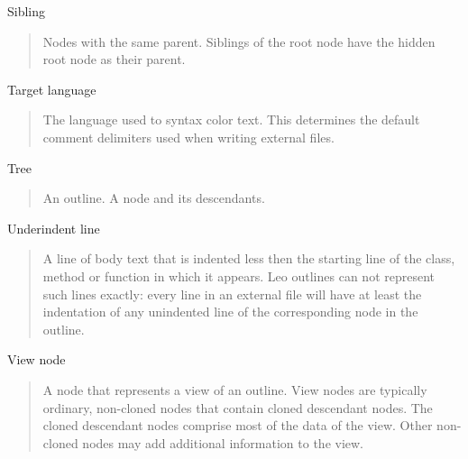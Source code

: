 \documentclass[a4paper,10pt,english]{sphinxmanual}
\begin{document}
Sibling
\begin{quote}

Nodes with the same parent. Siblings of the root node have the hidden root
node as their parent.
\end{quote}

Target language
\begin{quote}

The language used to syntax color text. This determines the default comment
delimiters used when writing external files.
\end{quote}

Tree
\begin{quote}

An outline. A node and its descendants.
\end{quote}

Underindent line
\begin{quote}

A line of body text that is indented less then the starting line of the
class, method or function in which it appears. Leo outlines can not
represent such lines exactly: every line in an external file will have at
least the indentation of any unindented line of the corresponding node in
the outline.
\end{quote}

View node
\begin{quote}

A node that represents a view of an outline. View nodes are typically
ordinary, non-cloned nodes that contain cloned descendant nodes. The cloned
descendant nodes comprise most of the data of the view. Other non-cloned
nodes may add additional information to the view.
\end{quote}
\end{document}
